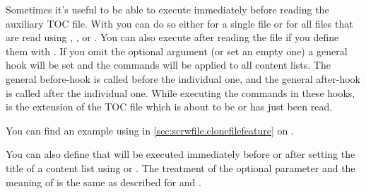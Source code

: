 \begin{Declaration}
\end{Declaration}
Sometimes it's useful to be able to execute  immediately
before reading the auxiliary TOC file. With  you can
do so either for a single file  or for all files that are
read using ,
, or .
You can also execute  after reading the file if you define
them with . If you omit the optional argument (or set
an empty one) a general hook will be set and the commands will be applied to
all content lists. The general before-hook is called before the individual
one, and the general after-hook is called after the individual one. While
executing the commands in these hooks,
 is the
extension of the TOC file which is about to be or has just been read.

You can find an example using  in
\autoref{sec:scrwfile.clonefilefeature} on
.
%
\EndIndexGroup


\begin{Declaration}
\end{Declaration}
You can also define  that will be executed immediately before
or after setting the title of a content list using
 or . The
treatment of the optional parameter and the meaning of
 is the same as
described for  and
.%
\EndIndexGroup


